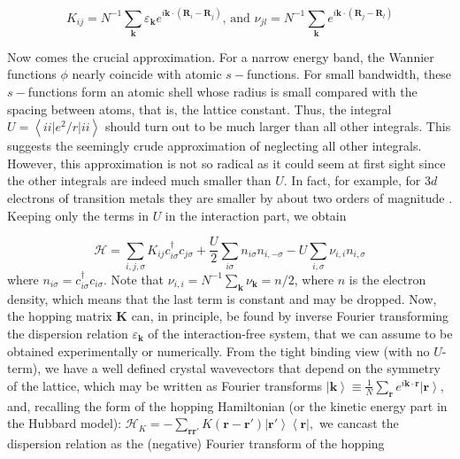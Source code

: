\begin{equation}\label{eq:hopping_matrix}
K_{ij} = N^{-1} \sum_{\bm k} \varepsilon_{\bm k} e^{i \bm k \cdot ( \bm R_i - \bm R_j )}, \, \text{and} \, \, \nu_{j l} = N^{-1} \sum_{\bm k} e^{i \bm k \cdot ( \bm R_j - \bm R_l) }
\end{equation}

Now comes the crucial approximation.
For a narrow energy band, the Wannier functions $\phi$ nearly coincide with atomic $s-$functions.
For small bandwidth, these $s-$functions form an atomic shell whose radius is small compared with the spacing between atoms, that is, the lattice constant.
Thus, the integral $U = \left\langle i i \big| e^2 / r \big| i i \right\rangle$ should turn out to be much larger than all other integrals.
This suggests the seemingly crude approximation of neglecting all other integrals.
However, this approximation is not so radical as it could seem at first sight since the other integrals are indeed much smaller than $U$.
In fact, for example, for $3d$ electrons of transition metals they are smaller by about two orders of magnitude \cite{hubbard_electron_1963}.
Keeping only the terms in $U$ in the interaction part, we obtain

\begin{equation}
\mathcal{H} = \sum_{i, j, \sigma} K_{ij} c_{i\sigma}^\dagger c_{j\sigma} + \frac{U}{2} \sum_{i\sigma} n_{i\sigma} n_{i, -\sigma} - U \sum_{i, \sigma} \nu_{i, i} n_{i, \sigma}
\end{equation}
where $n_{i\sigma} = c_{i\sigma}^\dagger c_{i\sigma}$.
Note that $\nu_{i, i} = N^{-1} \sum_{\bm k} \nu_{\bm k} = n/2$, where $n$ is the electron density, which means that the last term is constant and may be dropped.
Now, the hopping matrix $\bm K$ can, in principle, be found by inverse Fourier transforming the dispersion relation $\varepsilon_{\bm k}$ of the interaction-free system, that we can assume to be obtained experimentally or numerically.
From the tight binding view (with no $U$-term), we have a well defined crystal wavevectors that depend on the symmetry of the lattice, which may be written as Fourier transforms
$
\left| \bm k \right\rangle \equiv \frac{1}{N} \sum_{\bm r} e^{i\bm k \cdot \bm r} \left| \bm r \right\rangle , 
$
and, recalling the form of the hopping Hamiltonian (or the kinetic energy part in the Hubbard model):
$
\mathcal{H}_{K} = - \sum_{\bm r \bm r'} K (\bm r - \bm r') \left| \bm r' \right\rangle \left\langle \bm r \right| ,
$
 we cancast the dispersion relation as the (negative) Fourier transform of the hopping

